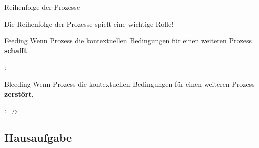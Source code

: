\begin{frame}{Reihenfolge der Prozesse}

Die Reihenfolge der Prozesse spielt eine wichtige Rolle!

	\begin{block}{Feeding}
	Wenn Prozess die kontextuellen Bedingungen für einen weiteren Prozess \textbf{schafft}.	

	\end{block}

	\ea {}:  \ras \textipa{[ha:k\textsyllabic{n}]} \ras \textipa{[ha:k\textsyllabic{N}]}
	\z

	\begin{block}{Bleeding}
	Wenn Prozess die kontextuellen Bedingungen für einen weiteren Prozess \textbf{zerstört}.
	\end{block}

	\ea {}:  \ras \textipa{[g@.zaNg]} \ras \textipa{[g@.zaN]} $\nrightarrow$ \textipa{[g@.zaNk]}
	\z
	

\end{frame}


\subsection{Hausaufgabe}

